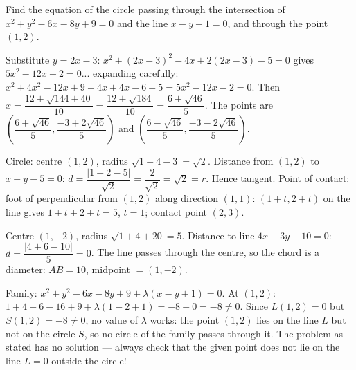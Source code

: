 \documentclass[11pt]{article}
\begin{document}
\begin{exercice}[Exercise 4]
Find the equation of the circle passing through the intersection of $x^{2} + y^{2} - 6x - 8y + 9 = 0$ and the line $x - y + 1 = 0$, and through the point $(1, 2)$.
\end{exercice}

\begin{corrige}[Exercise 1]
Substitute $y = 2x - 3$: $x^{2} + (2x-3)^{2} - 4x + 2(2x-3) - 5 = 0$ gives $5x^{2} - 12x - 2 = 0$... expanding carefully: $x^{2} + 4x^{2} - 12x + 9 - 4x + 4x - 6 - 5 = 5x^{2} - 12x - 2 = 0$. Then $x = \dfrac{12 \pm \sqrt{144 + 40}}{10} = \dfrac{12 \pm \sqrt{184}}{10} = \dfrac{6 \pm \sqrt{46}}{5}$. The points are $\left(\dfrac{6 + \sqrt{46}}{5}, \dfrac{-3 + 2\sqrt{46}}{5}\right)$ and $\left(\dfrac{6 - \sqrt{46}}{5}, \dfrac{-3 - 2\sqrt{46}}{5}\right)$.
\end{corrige}

\begin{corrige}[Exercise 2]
Circle: centre $(1, 2)$, radius $\sqrt{1 + 4 - 3} = \sqrt{2}$. Distance from $(1,2)$ to $x + y - 5 = 0$: $d = \dfrac{|1 + 2 - 5|}{\sqrt{2}} = \dfrac{2}{\sqrt{2}} = \sqrt{2} = r$. Hence tangent. Point of contact: foot of perpendicular from $(1,2)$ along direction $(1,1)$: $(1 + t, 2 + t)$ on the line gives $1 + t + 2 + t = 5$, $t = 1$; contact point $(2, 3)$.
\end{corrige}

\begin{corrige}[Exercise 3]
Centre $(1, -2)$, radius $\sqrt{1 + 4 + 20} = 5$. Distance to line $4x - 3y - 10 = 0$: $d = \dfrac{|4 + 6 - 10|}{5} = 0$. The line passes through the centre, so the chord is a diameter: $AB = 10$, midpoint $= (1, -2)$.
\end{corrige}

\begin{corrige}[Exercise 4]
Family: $x^{2} + y^{2} - 6x - 8y + 9 + \lambda(x - y + 1) = 0$. At $(1, 2)$: $1 + 4 - 6 - 16 + 9 + \lambda(1 - 2 + 1) = -8 + 0 = -8 \neq 0$. Since $L(1,2) = 0$ but $S(1,2) = -8 \neq 0$, no value of $\lambda$ works: the point $(1,2)$ lies on the line $L$ but not on the circle $S$, so no circle of the family passes through it. The problem as stated has no solution — always check that the given point does not lie on the line $L = 0$ outside the circle!
\end{corrige}
\end{document}

